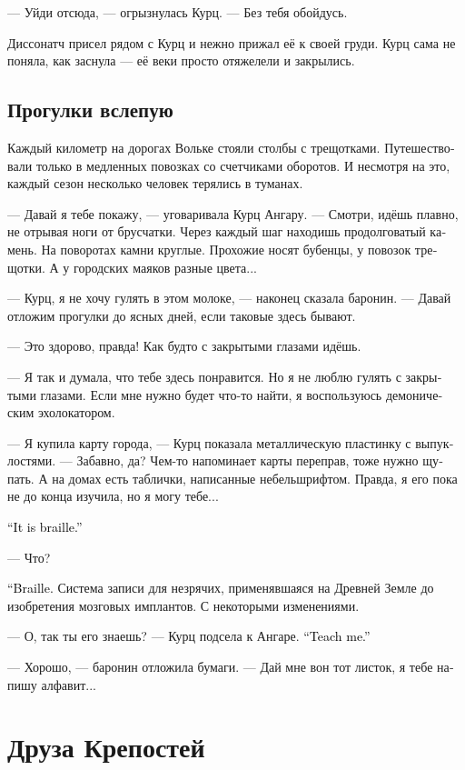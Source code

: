 \documentclass[a4paper,12pt,fleqn]{book}\usepackage{cooltooltips}\usepackage{polyglossia}\setdefaultlanguage[babelshorthands=true]{russian}\setotherlanguage{english}\defaultfontfeatures{Ligatures=TeX,Mapping=tex-text} \usepackage{xcolor}\definecolor{lightgray}{HTML}{bbbbbb}\color{lightgray}\newcommand{\ml}[3]{\textenglish{\textcolor{black}{#3}}}
\begin{document}
--- Уйди отсюда, --- огрызнулась Курц.
--- Без тебя обойдусь.

Диссонатч присел рядом с Курц и нежно прижал её к своей груди.
Курц сама не поняла, как заснула --- её веки просто отяжелели и закрылись.

\section{Прогулки вслепую}

Каждый километр на дорогах Вольке стояли столбы с трещотками.
Путешествовали только в медленных повозках со счетчиками оборотов.
И несмотря на это, каждый сезон несколько человек терялись в туманах.

--- Давай я тебе покажу, --- уговаривала Курц Ангару.
--- Смотри, идёшь плавно, не отрывая ноги от брусчатки.
Через каждый шаг находишь продолговатый камень.
На поворотах камни круглые.
Прохожие носят бубенцы, у повозок трещотки.
А у городских маяков разные цвета...

--- Курц, я не хочу гулять в этом молоке, --- наконец сказала баронин.
--- Давай отложим прогулки до ясных дней, если таковые здесь бывают.

--- Это здорово, правда!
Как будто с закрытыми глазами идёшь.

--- Я так и думала, что тебе здесь понравится.
Но я не люблю гулять с закрытыми глазами.
Если мне нужно будет что-то найти, я воспользуюсь демоническим эхолокатором.

--- Я купила карту города, --- Курц показала металлическую пластинку с выпуклостями.
--- Забавно, да?
Чем-то напоминает карты переправ, тоже нужно щупать.
А на домах есть таблички, написанные небельшрифтом. %
Правда, я его пока не до конца изучила, но я могу тебе...

\ml{$0$}
{--- Это браилле.}
{``It is braille.''}

--- Что?

\ml{$0$}
{--- Браилле.}
{``Braille.}
Система записи для незрячих, применявшаяся на Древней Земле до изобретения мозговых имплантов.
С некоторыми изменениями.

--- О, так ты его знаешь? --- Курц подсела к Ангаре.
\ml{$0$}
{--- Научи меня.}
{``Teach me.''}

--- Хорошо, --- баронин отложила бумаги.
--- Дай мне вон тот листок, я тебе напишу алфавит...

\chapter{Друза Крепостей}
\end{document}
